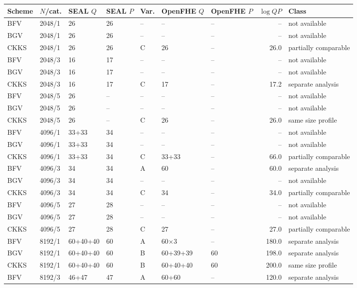 \begin{longtable}{@{}lllllllrl@{}}
\toprule
Scheme & $N$/cat. & SEAL $Q$ & SEAL $P$ & Var. & OpenFHE $Q$ & OpenFHE $P$ & $\log QP$ & Class \\
\midrule
\endhead
BFV & 2048/1 & 26 & 26 & -- & -- & -- & -- & not available \\
BGV & 2048/1 & 26 & 26 & -- & -- & -- & -- & not available \\
CKKS & 2048/1 & 26 & 26 & C & 26 & -- & 26.0 & partially comparable \\
BFV & 2048/3 & 16 & 17 & -- & -- & -- & -- & not available \\
BGV & 2048/3 & 16 & 17 & -- & -- & -- & -- & not available \\
CKKS & 2048/3 & 16 & 17 & C & 17 & -- & 17.2 & separate analysis \\
BFV & 2048/5 & 26 & -- & -- & -- & -- & -- & not available \\
BGV & 2048/5 & 26 & -- & -- & -- & -- & -- & not available \\
CKKS & 2048/5 & 26 & -- & C & 26 & -- & 26.0 & same size profile \\
BFV & 4096/1 & 33+33 & 34 & -- & -- & -- & -- & not available \\
BGV & 4096/1 & 33+33 & 34 & -- & -- & -- & -- & not available \\
CKKS & 4096/1 & 33+33 & 34 & C & 33+33 & -- & 66.0 & partially comparable \\
BFV & 4096/3 & 34 & 34 & A & 60 & -- & 60.0 & separate analysis \\
BGV & 4096/3 & 34 & 34 & -- & -- & -- & -- & not available \\
CKKS & 4096/3 & 34 & 34 & C & 34 & -- & 34.0 & partially comparable \\
BFV & 4096/5 & 27 & 28 & -- & -- & -- & -- & not available \\
BGV & 4096/5 & 27 & 28 & -- & -- & -- & -- & not available \\
CKKS & 4096/5 & 27 & 28 & C & 27 & -- & 27.0 & partially comparable \\
BFV & 8192/1 & 60+40+40 & 60 & A & 60$\times$3 & -- & 180.0 & separate analysis \\
BGV & 8192/1 & 60+40+40 & 60 & B & 60+39+39 & 60 & 198.0 & separate analysis \\
CKKS & 8192/1 & 60+40+40 & 60 & B & 60+40+40 & 60 & 200.0 & same size profile \\
BFV & 8192/3 & 46+47 & 47 & A & 60+60 & -- & 120.0 & separate analysis \\

\end{longtable}
